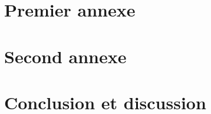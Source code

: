 \documentclass[a4paper]{article}
\begin{document}
\printindex

\appendix

\section{Premier annexe}
\section{Second annexe}

\section{Conclusion et discussion}

\tableofcontents    %
\listoffigures        %
\listoftables        %

\end{document}
